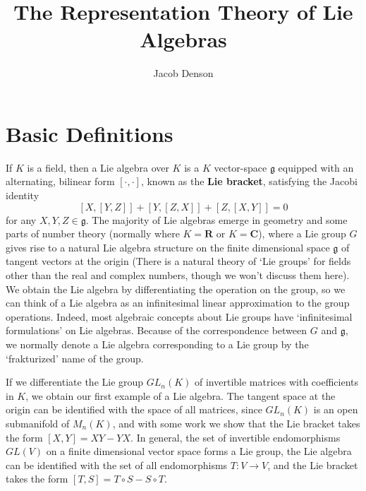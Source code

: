 

\title{The Representation Theory of Lie Algebras}
\author{Jacob Denson}




\maketitle

\tableofcontents


\chapter{Basic Definitions}

If $K$ is a field, then a Lie algebra over $K$ is a $K$ vector-space $\mathfrak{g}$ equipped with an alternating, bilinear form $[\cdot, \cdot]$, known as the {\bf Lie bracket}, satisfying the Jacobi identity
%
\[ [X,[Y,Z]] + [Y,[Z,X]] + [Z,[X,Y]] = 0 \]
%
for any $X,Y,Z \in \mathfrak{g}$. The majority of Lie algebras emerge in geometry and some parts of number theory (normally where $K = \mathbf{R}$ or $K = \mathbf{C}$), where a Lie group $G$ gives rise to a natural Lie algebra structure on the finite dimensional space $\mathfrak{g}$ of tangent vectors at the origin (There is a natural theory of `Lie groups' for fields other than the real and complex numbers, though we won't discuss them here). We obtain the Lie algebra by differentiating the operation on the group, so we can think of a Lie algebra as an infinitesimal linear approximation to the group operations. Indeed, most algebraic concepts about Lie groups have `infinitesimal formulations' on Lie algebras. Because of the correspondence between $G$ and $\mathfrak{g}$, we normally denote a Lie algebra corresponding to a Lie group by the `frakturized' name of the group.

\begin{example}
    If we differentiate the Lie group $GL_n(K)$ of invertible matrices with coefficients in $K$, we obtain our first example of a Lie algebra. The tangent space at the origin can be identified with the space of all matrices, since $GL_n(K)$ is an open submanifold of $M_n(K)$, and with some work we show that the Lie bracket takes the form $[X,Y] = XY - YX$. In general, the set of invertible endomorphisms $GL(V)$ on a finite dimensional vector space forms a Lie group, the Lie algebra can be identified with the set of all endomorphisms $T: V \to V$, and the Lie bracket takes the form $[T,S] = T \circ S - S \circ T$.
\end{example}

